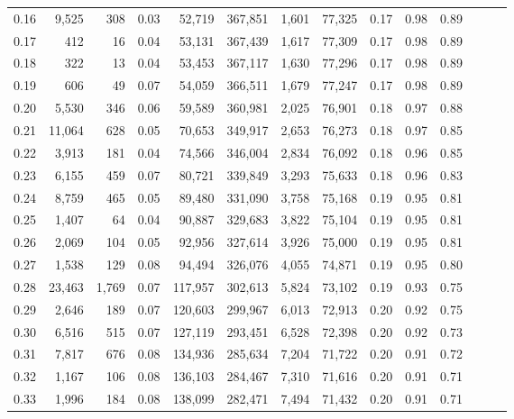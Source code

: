 \begin{tabular}{rrrrrrrrrrrrrr}
0.16 &   9,525 &    308 &  0.03 &   52,719 &  367,851 &   1,601 &  77,325 &  0.17 &  0.98 &      0.89 \\
0.17 &     412 &     16 &  0.04 &   53,131 &  367,439 &   1,617 &  77,309 &  0.17 &  0.98 &      0.89 \\
0.18 &     322 &     13 &  0.04 &   53,453 &  367,117 &   1,630 &  77,296 &  0.17 &  0.98 &      0.89 \\
0.19 &     606 &     49 &  0.07 &   54,059 &  366,511 &   1,679 &  77,247 &  0.17 &  0.98 &      0.89 \\
0.20 &   5,530 &    346 &  0.06 &   59,589 &  360,981 &   2,025 &  76,901 &  0.18 &  0.97 &      0.88 \\
0.21 &  11,064 &    628 &  0.05 &   70,653 &  349,917 &   2,653 &  76,273 &  0.18 &  0.97 &      0.85 \\
0.22 &   3,913 &    181 &  0.04 &   74,566 &  346,004 &   2,834 &  76,092 &  0.18 &  0.96 &      0.85 \\
0.23 &   6,155 &    459 &  0.07 &   80,721 &  339,849 &   3,293 &  75,633 &  0.18 &  0.96 &      0.83 \\
0.24 &   8,759 &    465 &  0.05 &   89,480 &  331,090 &   3,758 &  75,168 &  0.19 &  0.95 &      0.81 \\
0.25 &   1,407 &     64 &  0.04 &   90,887 &  329,683 &   3,822 &  75,104 &  0.19 &  0.95 &      0.81 \\
0.26 &   2,069 &    104 &  0.05 &   92,956 &  327,614 &   3,926 &  75,000 &  0.19 &  0.95 &      0.81 \\
0.27 &   1,538 &    129 &  0.08 &   94,494 &  326,076 &   4,055 &  74,871 &  0.19 &  0.95 &      0.80 \\
0.28 &  23,463 &  1,769 &  0.07 &  117,957 &  302,613 &   5,824 &  73,102 &  0.19 &  0.93 &      0.75 \\
0.29 &   2,646 &    189 &  0.07 &  120,603 &  299,967 &   6,013 &  72,913 &  0.20 &  0.92 &      0.75 \\
0.30 &   6,516 &    515 &  0.07 &  127,119 &  293,451 &   6,528 &  72,398 &  0.20 &  0.92 &      0.73 \\
0.31 &   7,817 &    676 &  0.08 &  134,936 &  285,634 &   7,204 &  71,722 &  0.20 &  0.91 &      0.72 \\
0.32 &   1,167 &    106 &  0.08 &  136,103 &  284,467 &   7,310 &  71,616 &  0.20 &  0.91 &      0.71 \\
0.33 &   1,996 &    184 &  0.08 &  138,099 &  282,471 &   7,494 &  71,432 &  0.20 &  0.91 &      0.71 \\

\end{tabular}
